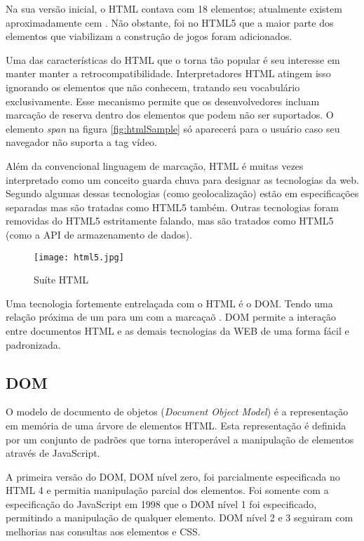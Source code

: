 Na sua versão inicial, o HTML contava com 18 elementos; atualmente
existem aproximadamente cem \autocite{diveIntohtml}. Não obstante, foi
no HTML5 que a maior parte dos elementos que viabilizam a construção
de jogos foram adicionados.

Uma das características do HTML que o torna tão popular é seu
interesse em manter manter a retrocompatibilidade. Interpretadores
HTML atingem isso ignorando os elementos que não conhecem, tratando
seu vocabulário exclusivamente. Esse mecanismo permite que os
desenvolvedores incluam marcação de reserva dentro dos elementos
que podem não ser suportados. O elemento \textit{span} na figura
\ref{fig:htmlSample} só aparecerá para o usuário caso seu navegador
não suporta a tag vídeo.

Além da convencional linguagem de marcação, HTML é muitas vezes
interpretado como um conceito guarda chuva para designar as tecnologias
da web. Segundo \autocite{diveIntohtml} algumas dessas tecnologias (como geolocalização) estão em especificações separadas mas são tratadas como HTML5 também. Outras
tecnologias foram removidas do HTML5 estritamente falando, mas são tratados
como HTML5 (como a API de armazenamento de dados).

\begin{figure}
    \centering
    \texttt{[image: html5.jpg]}
    \caption{Suíte HTML}
\end{figure}

Uma tecnologia fortemente entrelaçada com o HTML é o DOM.
Tendo uma relação próxima de um para um com a marcaçaõ
\autocite{howBrowsersWork}. DOM permite a interação entre documentos
HTML e as demais tecnologias da WEB de uma forma fácil e padronizada.

\subsection{DOM}

O modelo de documento de objetos (\textit{Document Object Model}) é
a representação em memória de uma árvore de elementos HTML. Esta
representação é definida por um conjunto de padrões que torna
interoperável a manipulação de elementos através de JavaScript.

A primeira versão do DOM, DOM nível zero, foi parcialmente
especificada no HTML 4 e permitia manipulação parcial dos elementos.
Foi somente com a especificação do JavaScript em 1998 que o DOM nível
1 foi especificado, permitindo a manipulação de qualquer elemento. DOM
nível 2 e 3 seguiram com melhorias nas consultas aos elementos e CSS.

